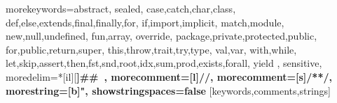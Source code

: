 

%
{morekeywords={abstract,%
  sealed,%
  case,catch,char,class,%
  def,else,extends,final,finally,for,%
  if,import,implicit,%
  match,module,%
  new,null,undefined,%
  fun,array,
  override,%
  package,private,protected,public,%
  for,public,return,super,%
  this,throw,trait,try,type,%
  val,var,%
  with,while,%
  let,skip,assert,then,fst,snd,root,idx,sum,prod,exists,forall,%
  yield%
  },%
  sensitive,%
  moredelim=*[il][\bfseries]{\#\#\ },
  morecomment=[l]//,%
  morecomment=[s]{/*}{*/},%
  morestring=[b]",%
  showstringspaces=false%
}[keywords,comments,strings]%



\newcommand{\commentstyle}[1]{\color{ccomment}\itshape{#1}}
\newcommand{\keywordstyle}[1]{\color{ckeyword}\bfseries{#1}}
\newcommand{\stringstyle}[1]{\color{cstring}\bfseries{#1}}


\newcommand{\code}[1]{\lstinline[language=Scala,columns=fixed,basicstyle=\ttfamily]|#1|}


\newcommand{\IMP}[0]{\texttt{IMP}}
\newcommand{\FUN}[0]{\texttt{FUN}}

\newcommand{\TOOL}[0]{\texttt{SIGMA}}



\newenvironment{sitemize}{
\begin{itemize}
  \setlength{\itemsep}{1pt}
  \setlength{\parskip}{0pt}
  \setlength{\parsep}{0pt}
}{\end{itemize}}

